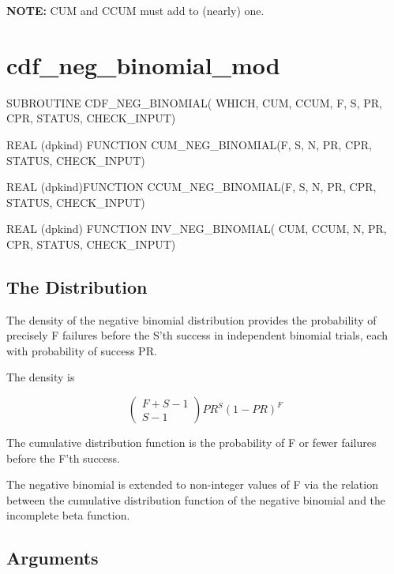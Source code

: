 \documentclass[12pt,dvips]{article}
\newcommand{\mysection}[1]{\color{blue}
             \section{#1} \normalcolor}
\newcommand{\mysubsection}[1] {\color{green}
             \subsection{#1} \normalcolor}
\begin{document}
{\bf NOTE:} CUM and CCUM  must add to (nearly) one.

\pagebreak

\mysection{cdf\_neg\_binomial\_mod}

\begin{description}

\item SUBROUTINE CDF\_NEG\_BINOMIAL( WHICH, CUM, CCUM, F, S, PR, CPR,
STATUS, CHECK\_INPUT)

\item    REAL   (dpkind)   FUNCTION    CUM\_NEG\_BINOMIAL(F, S,
N, PR, CPR, STATUS, CHECK\_INPUT)

\item    REAL    (dpkind)FUNCTION    CCUM\_NEG\_BINOMIAL(F, S,
N, PR, CPR,  STATUS, CHECK\_INPUT)

\item  REAL (dpkind) FUNCTION  INV\_NEG\_BINOMIAL(  CUM, CCUM,
N, PR, CPR, STATUS, CHECK\_INPUT)

\end{description}

\mysubsection{The Distribution}

The  density  of  the  negative  binomial  distribution  provides  the
probability  of  precisely  F  failures  before the  S'th  success  in
independent binomial trials, each with probability of success PR.

The density is

\[ \left( \begin{array}{c} F+S-1\\ S-1 \end{array} \right) PR^S (1-PR)^F \]

The cumulative distribution function is  the probability of F or fewer
failures before the F'th success.

The negative  binomial is extended to  non-integer values of  F via the
relation between the cumulative  distribution function of the negative
binomial and the incomplete beta function.

\mysubsection{Arguments}
\end{document}

